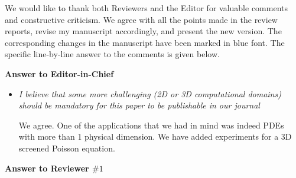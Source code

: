 \documentclass[12pt]{article}
\def\QST{\it\small}
\def\ANS{\noindent\par\rm\normalsize}
\begin{document}
We would like to thank both Reviewers and the Editor for valuable comments and constructive criticism.
We agree with all the points made in the review reports, revise my manuscript accordingly, and
   present the new version.
The corresponding changes in the manuscript have been marked in blue font.
The specific line-by-line answer to the comments is given below.



\begin{center}
\Large\bfseries{Answer to Editor-in-Chief}
\end{center}

\begin{itemize}
\item\QST
 I believe that some more challenging (2D or 3D computational domains) should be mandatory for this paper to be publishable in our journal
 
 \ANS
We agree. One of the applications that we had in mind was indeed PDEs with more than 1 physical dimension.
 We have added experiments for a 3D screened Poisson equation.

\end{itemize}

\begin{center}
\Large\bfseries{Answer to Reviewer $\# 1$}
\end{center}


\end{document}
